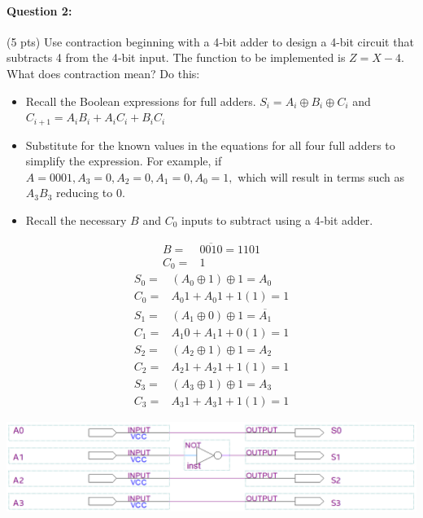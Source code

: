 \documentclass[12pt,letterpaper,titlepage]{report}
\begin{document}
\begin{raggedright}
\begin{multicols}{2}
\begin{enumerate} [label=\alph*)]
\end{enumerate}
\end{multicols}
\clearpage

\paragraph{Question 2:}
(5 pts) Use contraction beginning with a 4‐bit adder to design a 4-bit circuit that subtracts 4 from the 4‐bit input. The function to be implemented is $Z=X-4$. What does contraction mean? Do this:
\begin{itemize}[noitemsep]
\item Recall the Boolean expressions for full adders. $S_i=A_i \oplus B_i \oplus C_i$ and $C_{i+1} = A_iB_i + A_iC_i + B_iC_i$
\item Substitute for the known values in the equations for all four full adders to simplify the expression. For example, if $A=0001, A_3=0, A_2=0, A_1=0, A_0=1,$ which will result in terms such as $A_3B_3$ reducing to 0.
\item Recall the necessary $B$ and $C_0$ inputs to subtract using a 4‐bit adder.
\end{itemize}
\begin{multicols}{3}
\begin{align*}
B=&\overline{0010}=1101\\
C_0=&1
\end{align*}
\begin{align*}
S_0=&(A_0\oplus 1)\oplus 1=A_0
\\C_0=&A_0 1+A_0 1+1(1)=1
\end{align*}
\begin{align*}
S_1=&(A_1\oplus 0)\oplus 1=\overline{A_1}
\\C_1=&A_1 0+A_1 1+0(1)=1
\end{align*}
\begin{align*}
S_2=&(A_2\oplus 1)\oplus 1=A_2
\\C_2=&A_2 1+A_2 1+1(1)=1
\end{align*}
\begin{align*}
S_3=&(A_3\oplus 1)\oplus 1=A_3
\\C_3=&A_3 1+A_3 1+1(1)=1
\end{align*}
\end{multicols}
\includegraphics[width=\textwidth,height=0.9\textheight,keepaspectratio=true]{hw8p2}
\clearpage


\end{raggedright}
\end{document}
